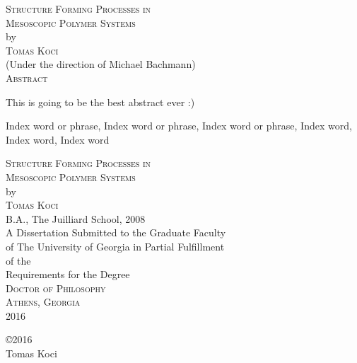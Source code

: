 \documentclass[12pt]{report}
\begin{document}
\newpage
\thispagestyle{empty}
\vspace*{18pt}
\begin{center}
\textsc{Structure Forming Processes in\\Mesoscopic Polymer Systems}\\[18pt]
by\\[18pt]
\textsc{Tomas Koci}\\[12pt]
(Under the direction of Michael Bachmann)\\[12pt]
\textsc{Abstract}
\end{center}
This is going to be the best abstract ever :)

\begin{list}{\sc Index words:\hfill}{\leftmargin 1.4in}
\item 
\begin{flushleft}\singlespacing
Index word or phrase,
Index word or phrase,
Index word or phrase,
Index word, 
Index word,
Index word
\end{flushleft}
\end{list}



\newpage
\thispagestyle{empty}
\vspace*{18pt}
\begin{center}
\textsc{Structure Forming Processes in\\Mesoscopic Polymer Systems}\\[18pt]
by\\[18pt]
\textsc{Tomas Koci}\\[12pt]
B.A., The Juilliard School, 2008\\
\vfill
A Dissertation Submitted to the Graduate Faculty \\
of The University of Georgia in Partial Fulfillment \\
of the \\
Requirements for the Degree \\[10pt]
\textsc{Doctor of Philosophy}\\[36pt]
\textsc{Athens, Georgia}\\[18pt]
2016
\end{center}

\newpage
\thispagestyle{empty}
\vspace*{5.5in}
\begin{center}
\copyright 2016 \\
Tomas Koci
\end{center}
\end{document}
